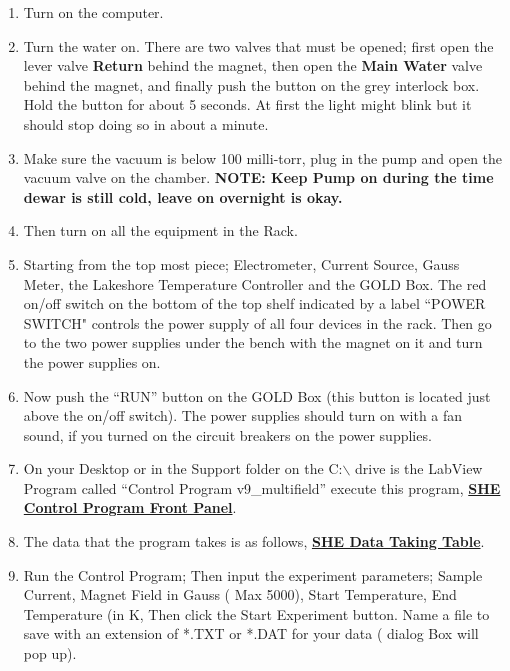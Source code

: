 \documentclass{../lab}
\begin{document}
\begin{enumerate}
    \item Turn on the computer.

    \item Turn the water on. There are two valves that must be opened; first open the lever valve \textbf{Return} behind the magnet, then open the \textbf{Main Water} valve behind the magnet, and finally push the button on the grey interlock box. Hold the button for about 5 seconds. At first the light might blink but it should stop doing so in about a minute.

    \item Make sure the vacuum is below 100 milli-torr, plug in the pump and open the vacuum valve on the chamber. \textbf{NOTE: Keep Pump on during the time dewar is still cold, leave on overnight is okay.}

    \item Then turn on all the equipment in the Rack.

    \item Starting from the top most piece; Electrometer, Current Source, Gauss Meter, the Lakeshore Temperature Controller and the GOLD Box. The red on/off switch on the bottom of the top shelf indicated by a label ``POWER SWITCH" controls the power supply of all four devices in the rack. Then go to the two power supplies under the bench with the magnet on it and turn the power supplies on.

    \item Now push the ``RUN'' button on the GOLD Box (this button is located just above the on/off switch). The power supplies should turn on with a fan sound, if you turned on the circuit breakers on the power supplies.

    \item On your Desktop or in the Support folder on the C:$\backslash$ drive is the LabView Program called ``Control Program v9\_multifield'' execute this program, \href{http://experimentationlab.berkeley.edu/sites/default/files/images/SHE_FrontPanel.pdf}{\textbf{SHE Control Program Front Panel}}.

    \item The data that the program takes is as follows, \href{http://experimentationlab.berkeley.edu/sites/default/files/images/SHE_Data_Taking_Table.pdf}{\textbf{SHE Data Taking Table}}.

    \item Run the Control Program; Then input the experiment parameters; Sample Current, Magnet Field in Gauss ( Max 5000), Start Temperature, End Temperature (in K, Then click the Start Experiment button. Name a file to save with an extension of *.TXT or *.DAT for your data ( dialog Box will pop up).


\end{enumerate}
\end{document}
